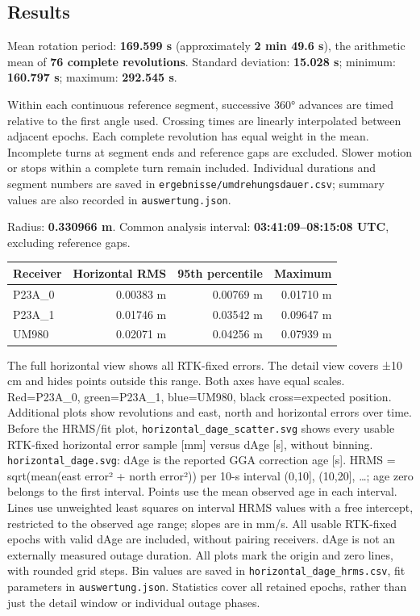 \documentclass[11pt,a4paper]{article}
\begin{document}
\subsection{Results}

Mean rotation period: \textbf{169.599 s} (approximately \textbf{2 min 49.6 s}), the arithmetic mean of \textbf{76 complete revolutions}. Standard deviation: \textbf{15.028 s}; minimum: \textbf{160.797 s}; maximum: \textbf{292.545 s}.

Within each continuous reference segment, successive 360° advances are timed relative to the first angle used. Crossing times are linearly interpolated between adjacent epochs. Each complete revolution has equal weight in the mean. Incomplete turns at segment ends and reference gaps are excluded. Slower motion or stops within a complete turn remain included. Individual durations and segment numbers are saved in {\small\texttt{ergebnisse/\allowbreak{}umdrehungsdauer.csv}}; summary values are also recorded in {\small\texttt{auswertung.json}}.

Radius: \textbf{0.330966 m}. Common analysis interval: \textbf{03:41:09–08:15:08 UTC}, excluding reference gaps.

\begin{center}\small\begin{tabular}{lrrr}\toprule
Receiver & Horizontal RMS & 95th percentile & Maximum\\\midrule
P23A\_0 & 0.00383 m & 0.00769 m & 0.01710 m\\
P23A\_1 & 0.01746 m & 0.03542 m & 0.09647 m\\
UM980 & 0.02071 m & 0.04256 m & 0.07939 m\\
\bottomrule\end{tabular}\end{center}

The full horizontal view shows all RTK-fixed errors. The detail view covers ±10 cm and hides points outside this range. Both axes have equal scales. Red=P23A\_0, green=P23A\_1, blue=UM980, black cross=expected position. Additional plots show revolutions and east, north and horizontal errors over time. Before the HRMS/fit plot, {\small\texttt{horizontal\_\allowbreak{}dage\_\allowbreak{}scatter.svg}} shows every usable RTK-fixed horizontal error sample [mm] versus dAge [s], without binning. {\small\texttt{horizontal\_\allowbreak{}dage.svg}}: dAge is the reported GGA correction age [s]. HRMS = sqrt(mean(east error² + north error²)) per 10-s interval (0,10], (10,20], …; age zero belongs to the first interval. Points use the mean observed age in each interval. Lines use unweighted least squares on interval HRMS values with a free intercept, restricted to the observed age range; slopes are in mm/s. All usable RTK-fixed epochs with valid dAge are included, without pairing receivers. dAge is not an externally measured outage duration. All plots mark the origin and zero lines, with rounded grid steps. Bin values are saved in {\small\texttt{horizontal\_\allowbreak{}dage\_\allowbreak{}hrms.csv}}, fit parameters in {\small\texttt{auswertung.json}}. Statistics cover all retained epochs, rather than just the detail window or individual outage phases.
\end{document}
